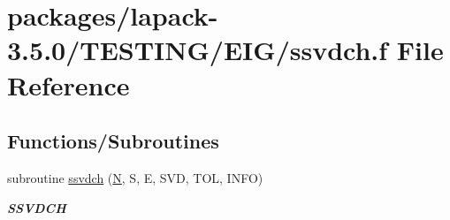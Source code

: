 \hypertarget{ssvdch_8f}{}\section{packages/lapack-\/3.5.0/\+T\+E\+S\+T\+I\+N\+G/\+E\+I\+G/ssvdch.f File Reference}
\label{ssvdch_8f}
\subsection*{Functions/\+Subroutines}
\begin{DoxyCompactItemize}
\item 
subroutine \hyperlink{group__single__eig_ga27173aa839453594dfc1a893dff10f60}{ssvdch} (\hyperlink{polmisc_8c_a0240ac851181b84ac374872dc5434ee4}{N}, S, E, S\+V\+D, T\+O\+L, I\+N\+F\+O)
\begin{DoxyCompactList}\small\item\em {\bfseries S\+S\+V\+D\+C\+H} \end{DoxyCompactList}\end{DoxyCompactItemize}
